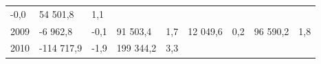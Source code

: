 \begin{longtable}[]{@{}lllllllll@{}}
\begin{minipage}[t]{0.06\columnwidth}
-0,0\strut
\end{minipage} & \begin{minipage}[t]{0.08\columnwidth}\raggedright
54 501,8\strut
\end{minipage} & \begin{minipage}[t]{0.06\columnwidth}\raggedright
1,1\strut
\end{minipage}\tabularnewline
\begin{minipage}[t]{0.05\columnwidth}\raggedright
2009\strut
\end{minipage} & \begin{minipage}[t]{0.10\columnwidth}\raggedright
-6 962,8\strut
\end{minipage} & \begin{minipage}[t]{0.06\columnwidth}\raggedright
-0,1\strut
\end{minipage} & \begin{minipage}[t]{0.17\columnwidth}\raggedright
91 503,4\strut
\end{minipage} & \begin{minipage}[t]{0.06\columnwidth}\raggedright
1,7\strut
\end{minipage} & \begin{minipage}[t]{0.12\columnwidth}\raggedright
12 049,6\strut
\end{minipage} & \begin{minipage}[t]{0.06\columnwidth}\raggedright
0,2\strut
\end{minipage} & \begin{minipage}[t]{0.08\columnwidth}\raggedright
96 590,2\strut
\end{minipage} & \begin{minipage}[t]{0.06\columnwidth}\raggedright
1,8\strut
\end{minipage}\tabularnewline
\begin{minipage}[t]{0.05\columnwidth}\raggedright
2010\strut
\end{minipage} & \begin{minipage}[t]{0.10\columnwidth}\raggedright
-114 717,9\strut
\end{minipage} & \begin{minipage}[t]{0.06\columnwidth}\raggedright
-1,9\strut
\end{minipage} & \begin{minipage}[t]{0.17\columnwidth}\raggedright
199 344,2\strut
\end{minipage} & \begin{minipage}[t]{0.06\columnwidth}\raggedright
3,3\strut
\end{minipage} & \begin{minipage}[t]{0.12\columnwidth}\raggedright

\end{minipage}
\end{longtable}
